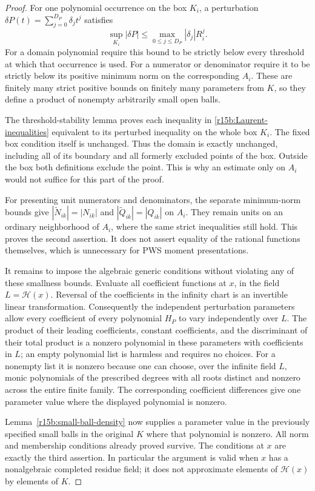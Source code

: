 \begin{proof}
For one polynomial occurrence on the box $K_i$, a perturbation
$\delta P(t)=\sum_{j=0}^{D_P}\delta_jt^j$ satisfies
\[
        \sup_{K_i}|\delta P|
                 \leq\max_{0\leq j\leq D_P}|\delta_j|R_i^j.
\tag{SP15.6}\label{r15b:uniform-box-bound}
\]
For a domain polynomial require this bound to be strictly below
every threshold at which that occurrence is used. For a numerator
or denominator require it to be strictly below its positive
minimum norm on the corresponding $A_i$. These are finitely
many strict positive bounds on finitely many parameters from $K$,
so they define a product of nonempty arbitrarily small open balls.

The threshold-stability lemma proves each inequality in
\eqref{r15b:Laurent-inequalities} equivalent to its perturbed
inequality on the whole box $K_i$. The fixed box condition itself
is unchanged. Thus the domain is exactly unchanged, including
all of its boundary and all formerly excluded points of the box.
Outside the box both definitions exclude the point. This is why
an estimate only on $A_i$ would not suffice for this part of the
proof.

For presenting unit numerators and denominators, the separate
minimum-norm bounds give
$|\widetilde N_{ik}|=|N_{ik}|$ and
$|\widetilde Q_{ik}|=|Q_{ik}|$ on $A_i$.
They remain units on an ordinary neighborhood of $A_i$, where
the same strict inequalities still hold. This proves the second
assertion. It does not assert equality of the rational functions
themselves, which is unnecessary for PWS moment presentations.

It remains to impose the algebraic generic conditions without
violating any of these smallness bounds. Evaluate all coefficient
functions at $x$, in the field $L=\mathcal H(x)$. Reversal of
the coefficients in the infinity chart is an invertible linear
transformation. Consequently the independent perturbation
parameters allow every coefficient of every polynomial $H_P$
to vary independently over $L$. The product of their leading
coefficients, constant coefficients, and the discriminant of
their total product is a nonzero polynomial in these parameters
with coefficients in $L$; an empty polynomial list is harmless
and requires no choices. For a nonempty list it is nonzero because one can choose,
over the infinite field $L$, monic polynomials of the prescribed
degrees with all roots distinct and nonzero across the entire
finite family. The corresponding coefficient differences give
one parameter value where the displayed polynomial is nonzero.

Lemma~\ref{r15b:small-ball-density} now supplies a parameter value
in the previously specified small balls in the original $K$
where that polynomial is nonzero. All norm and membership
conditions already proved survive. The conditions at $x$ are
exactly the third assertion. In particular the argument is valid
when $x$ has a nonalgebraic completed residue field; it does not
approximate elements of $\mathcal H(x)$ by elements of $K$.
\end{proof}

